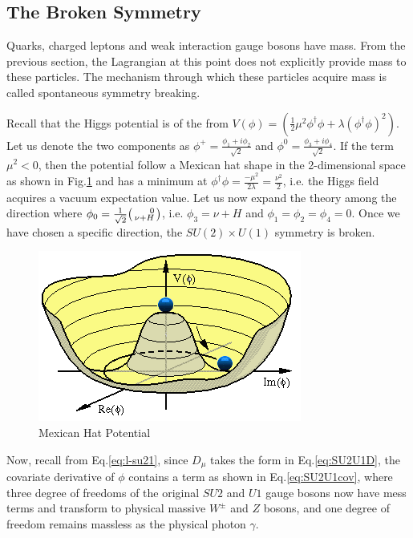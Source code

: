 \label{sec:theory-higgs}
\subsection{The Broken Symmetry}

Quarks, charged leptons and weak interaction gauge bosons have mass. From the previous section, the Lagrangian at this point does not explicitly provide mass to these particles. The mechanism through which these particles acquire mass is called spontaneous symmetry breaking.

Recall that the Higgs potential is of the from $V(\phi)=(\frac{1}{2}\mu^2\phi^{\dagger}\phi+\lambda(\phi^{\dagger}\phi )^2)$. Let us denote the two components as $\phi^+ = \frac{\phi_1+i\phi_2}{\sqrt{2}}$ and $\phi^0 = \frac{\phi_3+i\phi_4}{\sqrt{2}}$. If the term $\mu^2<0$, then the potential follow a Mexican hat shape in the 2-dimensional space as shown in Fig.\ref{fig:theory-mexican} and has a minimum at $\phi^{\dagger}\phi = \frac{-\mu^2}{2\lambda} = \frac{\nu^2}{2}$, i.e. the Higgs field acquires a vacuum expectation value. Let us now expand the theory among the direction where $\phi_0 = \frac{1}{\sqrt{2}}\begin{psmallmatrix*}[r]0\\ \nu+H \end{psmallmatrix*}$, i.e. $\phi_3=\nu+H$ and  $\phi_1=\phi_2=\phi_4 = 0$. Once we have chosen a specific direction, the $SU(2)\times U(1)$ symmetry is broken.


\begin{figure}[htpb!]
\begin{center}
  \includegraphics[width=0.45\linewidth]{figures/theory/MexicanHat.png}
\caption{Mexican Hat Potential}
\label{fig:theory-mexican}
\end{center}
\end{figure}


Now, recall from Eq.\ref{eq:l-su21}, since $D_{\mu}$ takes the form in Eq.\ref{eq:SU2U1D}, the covariate derivative of $\phi$ contains a term as shown in Eq.\ref{eq:SU2U1cov}, where three degree of freedoms of the original $SU2$ and $U1$ gauge bosons now have mess terms and transform to physical massive $W^{\pm}$ and $Z$ bosons, and one degree of freedom remains massless as the physical photon $\gamma$. 

